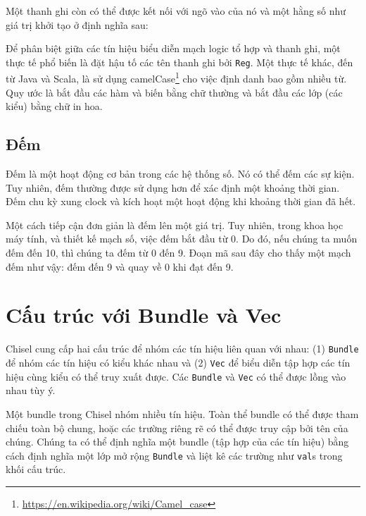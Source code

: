 \documentclass[%
    10pt,
    headinclude, footexclude,
    openright, %
    notitlepage,
    cleardoubleempty,
    headsepline,
    pointlessnumbers,
    bibtotoc, idxtotoc,
    ]{scrbook}
\newcommand{\code}[1]{{\small{\texttt{#1}}}}
\newcommand{\myref}[2]{\href{#1}{#2}}
\renewcommand{\myref}[2]{{#2}{\footnote{\url{#1}}}}
\begin{document}
\noindent Một thanh ghi còn có thể được kết nối với ngõ vào của nó và một hằng số như giá trị khởi tạo ở định nghĩa sau:


\noindent Để phân biệt giữa các tín hiệu biểu diễn mạch logic tổ hợp và thanh ghi,
một thực tế phổ biến là đặt hậu tố các tên thanh ghi bởi \code{Reg}.
Một thực tế khác, đến từ Java và Scala, là sử dụng 
\myref{https://en.wikipedia.org/wiki/Camel_case}{camelCase} 
cho việc định danh bao gồm nhiều từ. Quy ước là bắt đầu các hàm 
và biến bằng chữ thường và bắt đầu các lớp (các kiểu) bằng chữ in hoa.

\subsection{Đếm}


Đếm là một hoạt động cơ bản trong các hệ thống số. Nó có thể đếm các sự kiện. 
Tuy nhiên, đếm thường được sử dụng hơn để xác định một khoảng thời gian. 
Đếm chu kỳ xung clock và kích hoạt một hoạt động khi khoảng thời gian đã hết.

Một cách tiếp cận đơn giản là đếm lên một giá trị. Tuy nhiên, trong khoa học máy tính,
và thiết kế mạch số, việc đếm bắt đầu từ 0. Do đó, nếu chúng ta muốn đếm đến 10, 
thì chúng ta đếm từ 0 đến 9. Đoạn mã sau đây cho thấy một mạch đếm như vậy: đếm đến 9 và quay về 0 khi đạt đến 9.


\section{Cấu trúc với Bundle và Vec}


Chisel cung cấp hai cấu trúc để nhóm các tín hiệu liên quan với nhau: (1) \code{Bundle} để nhóm
các tín hiệu có kiểu khác nhau và (2) \code{Vec} để biểu diễn tập hợp các tín hiệu cùng kiểu có thể truy xuất được.
Các \code{Bundle} và \code{Vec} có thể được lồng vào nhau tùy ý.

Một bundle trong Chisel nhóm nhiều tín hiệu. Toàn thể bundle có thể được tham chiếu
toàn bộ chung, hoặc các trường riêng rẽ có thể được truy cập bởi tên của chúng.
Chúng ta có thể định nghĩa một bundle (tập hợp của các tín hiệu) bằng cách định nghĩa một lớp 
mở rộng \code{Bundle} và liệt kê các trường như \code{val}s trong khối cấu trúc.
\end{document}
